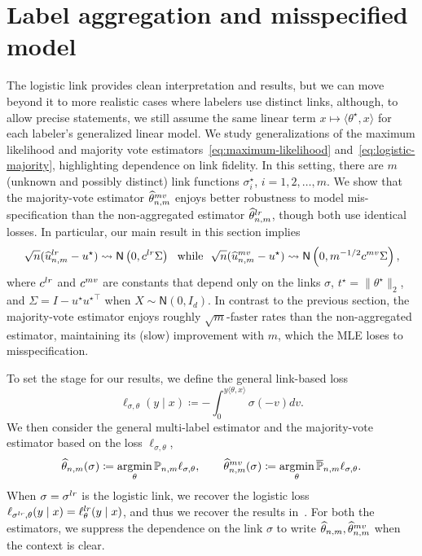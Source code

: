 \documentclass[11pt]{article}
\newcommand{\cc}[1]{\textcolor{cc}{[CC: #1]}}
\newcommand{\Prb}{\mathbb{P}}
\newcommand{\what}[1]{\widehat{#1}}
\newcommand{\wb}[1]{\overline{#1}}
\newcommand{\normal}{\mathsf{N}}
\newcommand{\lr}{^{\textup{lr}}}
\newcommand{\mv}{^{\textup{mv}}}
\newcommand{\loss}{\ell}
\newcommand{\norms}[1]{\|{#1}\|} %
\newcommand{\ltwos}[1]{\norms{#1}_2} %
\newcommand{\<}{\langle} %
\renewcommand{\>}{\rangle}
\DeclareMathOperator*{\argmin}{argmin}
\newcommand{\cd}{\rightsquigarrow}
\newcommand{\defeq}{\coloneqq}
\newcommand{\opt}{^\star}
\newcommand{\gme}{\what{\theta}_{n,m}} %
\newcommand{\tmle}{\what{\theta}\lr_{n,m}} %
\newcommand{\mve}{\what{\theta}\mv_{n,m}} %
\begin{document}



\section{Label aggregation and misspecified model}
\label{sec:mis-spec}

The logistic link provides clean interpretation and results, but we can
move beyond it to more realistic cases where labelers use
distinct links, although, to allow precise statements, we still assume the
same linear term $x \mapsto \<\theta\opt, x\>$ for each labeler's
generalized linear model. We study generalizations of the maximum
likelihood and majority vote estimators~\eqref{eq:maximum-likelihood}
and~\eqref{eq:logistic-majority}, highlighting dependence on
link fidelity.
In this setting, there are $m$ (unknown and possibly distinct)
link functions $\sigma_i\opt$, $i=1,2, \ldots, m$.
We show that the majority-vote estimator $\mve$ enjoys better robustness to model mis-specification than the non-aggregated estimator $\tmle$,
though both use identical losses.
In particular, our main result in this section implies
\begin{equation*}
\sqrt{n}(\what{u}\lr_{n,m} - u\opt) \cd
\normal\left(0, c\lr \Sigma\right)
~~ \mbox{while} ~~
\sqrt{n}(\what{u}\mv_{n,m} - u\opt) \cd
\normal\left(0, m^{-1/2} c\mv \Sigma\right),
\end{equation*}
where $c\lr$ and $c\mv$ are constants that depend only on the links $\sigma$,
$t\opt =
\ltwos{\theta\opt}$, and $\Sigma = I - u\opt {u\opt}^\top$ when $X \sim
\normal(0, I_d)$.  In contrast to the previous section, the majority-vote
estimator enjoys roughly $\sqrt{m}$-faster rates than the non-aggregated
estimator, maintaining its (slow) improvement with $m$, which the
MLE loses to misspecification.

To set the stage for our results, we define the
general link-based loss
\begin{equation*}
  \loss_{\sigma,\theta} (y \mid x) \defeq -\int_0^{y \<\theta, x\>} \sigma(-v) dv.
\end{equation*}
We then consider the general multi-label estimator and the majority-vote
estimator based on the loss $\loss_{\sigma,\theta}$,
\begin{equation}
  \label{eqn:general-estimators}
  \gme(\sigma) \defeq \argmin_\theta \Prb_{n,m} \loss_{\sigma, \theta},
  \qquad
  \mve(\sigma) \defeq \argmin_\theta \wb{\Prb}_{n,m} \loss_{\sigma, \theta}.
\end{equation}
When $\sigma = \sigma\lr$ is the logistic link, we recover the logistic loss
$\loss_{\sigma\lr,\theta} (y \mid x) = \loss_\theta\lr(y \mid x)$, and thus
we recover the results in~.  For both the
estimators, we suppress the dependence on the link $\sigma$
to write $\gme, \mve$ when the context is clear.
\end{document}

